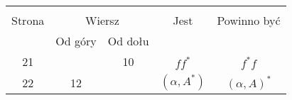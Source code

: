 \documentclass[a4paper,11pt]{article}
\begin{document}
\begin{center}
  \begin{tabular}{|c|c|c|c|c|}
    \hline
    & \multicolumn{2}{c|}{} & & \\
    Strona & \multicolumn{2}{c|}{Wiersz} & Jest
                              & Powinno być \\ \cline{2-3}
    & Od góry & Od dołu & & \\
    \hline
    21  & & 10 & $ff^{ * }$ & $f^{ * }\! f$ \\
    22  & 12 & & $( \alpha, A^{ * } )$ & $( \alpha, A )^{ * }$ \\
    \hline
  \end{tabular}
\end{center}



 {}



\end{document}
